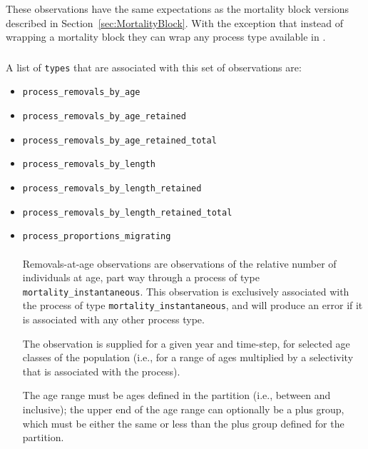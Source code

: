These observations have the same expectations as the mortality block versions described in Section~\ref{sec:MortalityBlock}. With the exception that instead of wrapping a mortality block they can wrap any process type available in \CNAME.

\subsubsection{}

A list of \texttt{types} that are associated with this set of observations are:

\ifAgeBased
\begin{itemize}
	\item \texttt{process\_removals\_by\_age}
	\item \texttt{process\_removals\_by\_age\_retained}
	\item \texttt{process\_removals\_by\_age\_retained\_total}
	\item \texttt{process\_removals\_by\_length}
	\item \texttt{process\_removals\_by\_length\_retained}
	\item \texttt{process\_removals\_by\_length\_retained\_total}
	\item \texttt{process\_proportions\_migrating}
	
	\paragraph*{\label{sec:removals-by-age}}\label{sec:Observation-ProcessRemovalsByAge}
	
	Removals-at-age observations are observations of the relative number of individuals at age, part way through a process of type \texttt{mortality\_instantaneous}. This observation is exclusively associated with the process of type \texttt{mortality\_instantaneous}, and will produce an error if it is associated with any other process type.
	
	The observation is supplied for a given year and time-step, for selected age classes of the population (i.e., for a range of ages multiplied by a selectivity that is associated with the process).
	
	The age range must be ages defined in the partition (i.e., between  and  inclusive); the upper end of the age range can optionally be a plus group, which must be either the same or less than the plus group defined for the partition.
	

\end{itemize}
